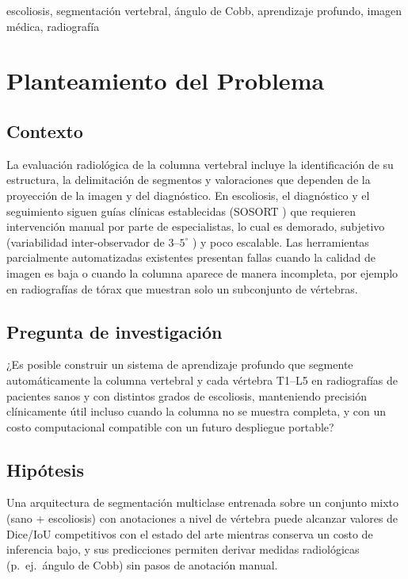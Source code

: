 \documentclass[conference]{IEEEtran}
\begin{document}
\begin{IEEEkeywords}
escoliosis, segmentación vertebral, ángulo de Cobb, aprendizaje profundo, imagen médica, radiografía
\end{IEEEkeywords}

\section{Planteamiento del Problema}
\label{sec:problema}

\subsection{Contexto}
La evaluación radiológica de la columna vertebral incluye la identificación de su estructura, la delimitación de segmentos y valoraciones que dependen de la proyección de la imagen y del diagnóstico. En escoliosis, el diagnóstico y el seguimiento siguen guías clínicas establecidas (SOSORT \cite{sosort}) que requieren intervención manual por parte de especialistas, lo cual es demorado, subjetivo (variabilidad inter-observador de $3$--$5^{\circ}$ \cite{cobb_interrater}) y poco escalable. Las herramientas parcialmente automatizadas existentes presentan fallas cuando la calidad de imagen es baja o cuando la columna aparece de manera incompleta, por ejemplo en radiografías de tórax que muestran solo un subconjunto de vértebras.

\subsection{Pregunta de investigación}
¿Es posible construir un sistema de aprendizaje profundo que segmente automáticamente la columna vertebral y cada vértebra T1--L5 en radiografías de pacientes sanos y con distintos grados de escoliosis, manteniendo precisión clínicamente útil incluso cuando la columna no se muestra completa, y con un costo computacional compatible con un futuro despliegue portable?

\subsection{Hipótesis}
Una arquitectura de segmentación multiclase entrenada sobre un conjunto mixto (sano + escoliosis) con anotaciones a nivel de vértebra puede alcanzar valores de Dice/IoU competitivos con el estado del arte mientras conserva un costo de inferencia bajo, y sus predicciones permiten derivar medidas radiológicas (p.~ej.\ ángulo de Cobb) sin pasos de anotación manual.
\end{document}
